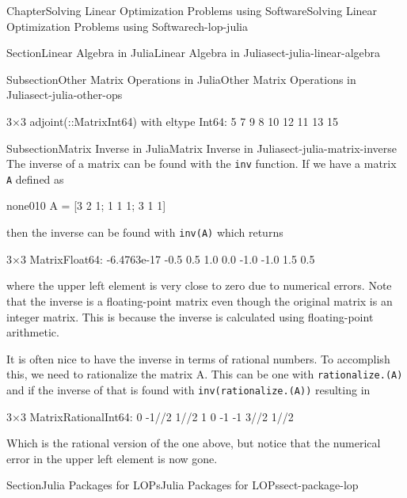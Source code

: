 \documentclass[oneside,10pt,]{book}
\newcommand{\mono}[1]{\texttt{#1}}
\numberwithin{equation}{section}
\begin{document}
\begin{chapterptx}{Chapter}{Solving Linear Optimization Problems using Software}{}{Solving Linear Optimization Problems using Software}{}{}{ch-lop-julia}
\begin{sectionptx}{Section}{Linear Algebra in Julia}{}{Linear Algebra in Julia}{}{}{sect-julia-linear-algebra}
\begin{subsectionptx}{Subsection}{Other Matrix Operations in Julia}{}{Other Matrix Operations in Julia}{}{}{sect-julia-other-ops}
\par
%
\begin{codedisplay}
3×3 adjoint(::Matrix{Int64}) with eltype Int64:
 5   7   9
 8  10  12
11  13  15
\end{codedisplay}
%
\end{subsectionptx}
%
%
\typeout{************************************************}
\typeout{************************************************}
%
\begin{subsectionptx}{Subsection}{Matrix Inverse in Julia}{}{Matrix Inverse in Julia}{}{}{sect-julia-matrix-inverse}
The inverse of a matrix can be found with the \mono{inv} function. If we have a matrix \mono{A} defined as%
\begin{program}{none}{0}{1}{0}
A = [3 2 1; 1 1 1; 3 1 1]
\end{program}
then the inverse can be found with \mono{inv(A)} which returns%
\par
%
\begin{codedisplay}
3×3 Matrix{Float64}:
 -6.4763e-17  -0.5   0.5
 1.0           0.0  -1.0
-1.0           1.5   0.5
\end{codedisplay}
%
\par
where the upper left element is very close to zero due to numerical errors. Note that the inverse is a floating-point matrix even though the original matrix is an integer matrix. This is because the inverse is calculated using floating-point arithmetic.%
\par
It is often nice to have the inverse in terms of rational numbers. To accomplish this, we need to rationalize the matrix A. This can be one with \mono{rationalize.(A)} and if the inverse of that is found with \mono{inv(rationalize.(A))} resulting in%
\par
%
\begin{codedisplay}
3×3 Matrix{Rational{Int64}}:
  0  -1//2  1//2
  1    0    -1
 -1   3//2  1//2
\end{codedisplay}
%
\par
Which is the rational version of the one above, but notice that the numerical error in the upper left element is now gone.%
\end{subsectionptx}
\end{sectionptx}
%
%
\typeout{************************************************}
\typeout{************************************************}
%
\begin{sectionptx}{Section}{Julia Packages for LOPs}{}{Julia Packages for LOPs}{}{}{sect-package-lop}

\end{sectionptx}
\end{chapterptx}
\end{document}
